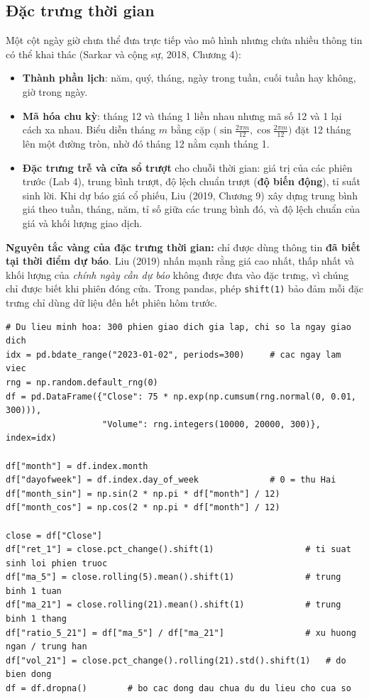 \subsection{Đặc trưng thời gian}

Một cột ngày giờ chưa thể đưa trực tiếp vào mô hình nhưng chứa nhiều thông tin có thể khai thác (Sarkar và cộng sự, 2018, Chương 4):
\begin{itemize}
    \item \textbf{Thành phần lịch}: năm, quý, tháng, ngày trong tuần, cuối tuần hay không, giờ trong ngày.
    \item \textbf{Mã hóa chu kỳ}: tháng 12 và tháng 1 liền nhau nhưng mã số 12 và 1 lại cách xa nhau. Biểu diễn tháng $m$ bằng cặp $\big(\sin\frac{2\pi m}{12}, \cos\frac{2\pi m}{12}\big)$ đặt 12 tháng lên một đường tròn, nhờ đó tháng 12 nằm cạnh tháng 1.
    \item \textbf{Đặc trưng trễ và cửa sổ trượt} cho chuỗi thời gian: giá trị của các phiên trước (Lab 4), trung bình trượt, độ lệch chuẩn trượt (\textbf{độ biến động}), tỉ suất sinh lời. Khi dự báo giá cổ phiếu, Liu (2019, Chương 9) xây dựng trung bình giá theo tuần, tháng, năm, tỉ số giữa các trung bình đó, và độ lệch chuẩn của giá và khối lượng giao dịch.
\end{itemize}

\noindent\textbf{Nguyên tắc vàng của đặc trưng thời gian:} chỉ được dùng thông tin \textbf{đã biết tại thời điểm dự báo}. Liu (2019) nhấn mạnh rằng giá cao nhất, thấp nhất và khối lượng của \textit{chính ngày cần dự báo} không được đưa vào đặc trưng, vì chúng chỉ được biết khi phiên đóng cửa. Trong pandas, phép \texttt{shift(1)} bảo đảm mỗi đặc trưng chỉ dùng dữ liệu đến hết phiên hôm trước.

\begin{lstlisting}[caption={Tạo đặc trưng thời gian và đặc trưng cửa sổ trượt}]
# Du lieu minh hoa: 300 phien giao dich gia lap, chi so la ngay giao dich
idx = pd.bdate_range("2023-01-02", periods=300)     # cac ngay lam viec
rng = np.random.default_rng(0)
df = pd.DataFrame({"Close": 75 * np.exp(np.cumsum(rng.normal(0, 0.01, 300))),
                   "Volume": rng.integers(10000, 20000, 300)}, index=idx)

df["month"] = df.index.month
df["dayofweek"] = df.index.day_of_week              # 0 = thu Hai
df["month_sin"] = np.sin(2 * np.pi * df["month"] / 12)
df["month_cos"] = np.cos(2 * np.pi * df["month"] / 12)

close = df["Close"]
df["ret_1"] = close.pct_change().shift(1)                  # ti suat sinh loi phien truoc
df["ma_5"] = close.rolling(5).mean().shift(1)              # trung binh 1 tuan
df["ma_21"] = close.rolling(21).mean().shift(1)            # trung binh 1 thang
df["ratio_5_21"] = df["ma_5"] / df["ma_21"]                # xu huong ngan / trung han
df["vol_21"] = close.pct_change().rolling(21).std().shift(1)   # do bien dong
df = df.dropna()        # bo cac dong dau chua du du lieu cho cua so
\end{lstlisting}


